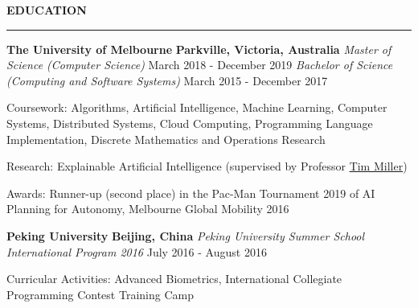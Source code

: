 \documentclass{cv}
\begin{document}
\smallskip


\textbf{\uppercase{Education}}
\sectionlineskip
\hrule height 0.6pt
\begin{list}{}{\setlength{\leftmargin}{0pt}}
\itemsep 2.0pt
\item
    \textbf{The University of Melbourne} \hfill \textbf{Parkville, Victoria, Australia}%
    \vspace{1.0pt} \newline
    {\textit{Master of Science (Computer Science)}} \hfill {March 2018 - December 2019}%
    \newline
    {\textit{Bachelor of Science (Computing and Software Systems)}} \hfill {March 2015 - December 2017}%
    \begin{list}{\raisebox{2.0pt}{\tiny$\bullet$}\space}{\setlength{\leftmargin}{11.2pt}}
        \itemsep -4.0pt \vspace{-4.0pt}
        \item Coursework: Algorithms, Artificial Intelligence, Machine Learning, Computer Systems, Distributed Systems, Cloud Computing, Programming Language Implementation, Discrete Mathematics and Operations Research
        \item Research: Explainable Artificial Intelligence (supervised by Professor \href{https://eecs.uq.edu.au/profile/9477/tim-miller}{Tim Miller})
        \item Awards: Runner-up (second place) in the Pac-Man Tournament 2019 of AI Planning for Autonomy, Melbourne Global Mobility 2016
    \end{list}
\item
    \textbf{Peking University} \hfill \textbf{Beijing, China}%
    \vspace{1.0pt} \newline 
    {\textit{Peking University Summer School International Program 2016}} \hfill {July 2016 - August 2016}%
    \begin{list}{\raisebox{2.0pt}{\tiny$\bullet$}\space}{\setlength{\leftmargin}{11.2pt}}
        \itemsep -4.0pt \vspace{-4.0pt}
        \item Curricular Activities: Advanced Biometrics, International Collegiate Programming Contest Training Camp
    \end{list}
\end{list}
\end{document}
